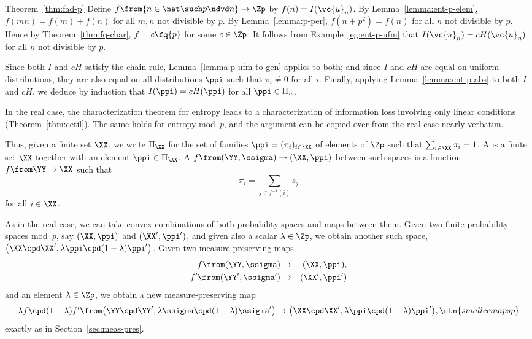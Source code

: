 \begin{pfof}{Theorem~\ref{thm:fad-p}}
Define $f \from \{ n \in \nat \such p \ndvd n\} \to \Zp$ by $f(n) =
I(\vc{u}_n)$.  By Lemma~\ref{lemma:ent-p-elem}, $f(mn) = f(m) + f(n)$ for
all $m, n$ not divisible by $p$.  By Lemma~\ref{lemma:p-per}, $f(n + p^2) =
f(n)$ for all $n$ not divisible by $p$.  Hence by
Theorem~\ref{thm:fq-char}, $f = c\fq{p}$ for some $c \in \Zp$.  It follows
from Example~\ref{eg:ent-p-ufm} that $I(\vc{u}_n) = cH(\vc{u}_n)$ for all
$n$ not divisible by $p$.

Since both $I$ and $cH$ satisfy the chain rule,
Lemma~\ref{lemma:p-ufm-to-gen} applies to both; and since $I$ and $cH$ are
equal on uniform distributions, they are also equal on all distributions
$\ppi$ such that $\pi_i \neq 0$ for all $i$.  Finally, applying
Lemma~\ref{lemma:ent-p-abs} to both $I$ and $cH$, we deduce by 
induction that $I(\ppi) = cH(\ppi)$ for all $\ppi \in \Pi_n$.
\end{pfof}

In the real case, the characterization theorem for entropy leads to a
characterization of information loss involving only linear conditions
(Theorem~\ref{thm:cetil}).  The same holds for entropy mod~$p$, and the
argument can be copied over from the real case nearly verbatim.

Thus, given a finite set $\XX$, we write $\Pi_\XX$ for the set of families
$\ppi = (\pi_i)_{i \in \XX}$ of elements of $\Zp$ such that $\sum_{i \in \XX}
\pi_i = 1$.  A %
%
%
is a finite set $\XX$ together with an element $\ppi \in \Pi_\XX$.  A
 $f \from (\YY, \ssigma) \to (\XX, \ppi)$
between such spaces is a function $f \from \YY \to \XX$ such that
\[
\pi_i = \sum_{j \in f^{-1}(i)} s_j
\]
for all $i \in \XX$.  

As in the real case, we can take convex combinations of both
probability spaces and maps between them.  Given two finite probability
spaces mod~$p$, say $(\XX, \ppi)$ and $(\XX', \ppi')$, and given also a
scalar $\lambda \in \Zp$, we obtain another such space, $\bigl(\XX \cpd
\XX', \lambda\ppi \cpd (1 - \lambda)\ppi'\bigr)$.  Given
two measure-preserving maps
\begin{eqnarray*}
f \from         (\YY, \ssigma)   &\to&    (\XX, \ppi), \\
f' \from        (\YY', \ssigma') &\to&    (\XX', \ppi')
\end{eqnarray*}
and an element $\lambda \in \Zp$, we obtain a new measure-preserving map
\[
\lambda f \cpd (1 - \lambda) f'
\from
\bigl(\YY \cpd \YY', \lambda\ssigma \cpd (1 - \lambda)\ssigma'\bigr)
\to
\bigl(\XX \cpd \XX', \lambda\ppi \cpd (1 - \lambda)\ppi'\bigr),
\ntn{smallccmapsp}
\]
exactly as in Section~\ref{sec:meas-pres}.

